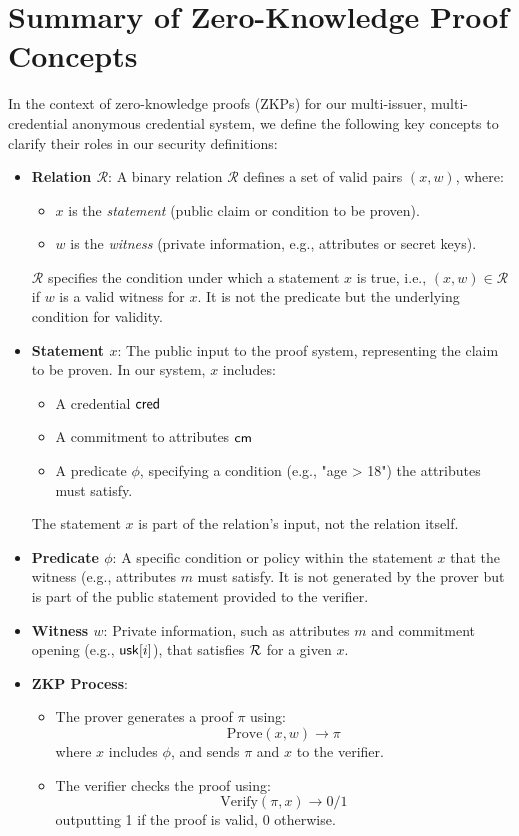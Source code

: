 \newpage
\section{Summary of Zero-Knowledge Proof Concepts}

In the context of zero-knowledge proofs (ZKPs) for our multi-issuer, multi-credential anonymous credential system, we define the following key concepts to clarify their roles in our security definitions:

\begin{itemize}
    \item \textbf{Relation \(\mathcal{R}\)}: A binary relation \(\mathcal{R}\) defines a set of valid pairs \((x, w)\), where:
    \begin{itemize}
        \item \(x\) is the \emph{statement} (public claim or condition to be proven).
        \item \(w\) is the \emph{witness} (private information, e.g., attributes or secret keys).
    \end{itemize}
    \(\mathcal{R}\) specifies the condition under which a statement \(x\) is true, i.e., \((x, w) \in \mathcal{R}\) if \(w\) is a valid witness for \(x\). It is not the predicate but the underlying condition for validity.

    \item \textbf{Statement \(x\)}: The public input to the proof system, representing the claim to be proven. In our system, \(x\) includes:
    \begin{itemize}
        \item A credential $\mathsf{cred}$
        \item A commitment to attributes $\mathsf{cm}$
        \item A predicate $\phi$, specifying a condition (e.g., "age > 18") the attributes must satisfy.
    \end{itemize}
    The statement $x$ is part of the relation's input, not the relation itself.

    \item \textbf{Predicate $\phi$}: A specific condition or policy within the statement $x$ that the witness (e.g., attributes $m$ must satisfy. It is not generated by the prover but is part of the public statement provided to the verifier.

    \item \textbf{Witness $w$}: Private information, such as attributes $m$ and commitment opening (e.g., $\mathsf{usk}[i]$), that satisfies $\mathcal{R}$ for a given $x$.

    \item \textbf{ZKP Process}:
    \begin{itemize}
        \item The prover generates a proof $\pi$ using:
        \[
        \text{Prove}(x, w) \rightarrow \pi
        \]
        where $x$ includes $\phi$, and sends $\pi$ and $x$ to the verifier.
        \item The verifier checks the proof using:
        \[
        \text{Verify}(\pi, x) \rightarrow 0/1
        \]
        outputting 1 if the proof is valid, 0 otherwise.
    \end{itemize}
\end{itemize}
